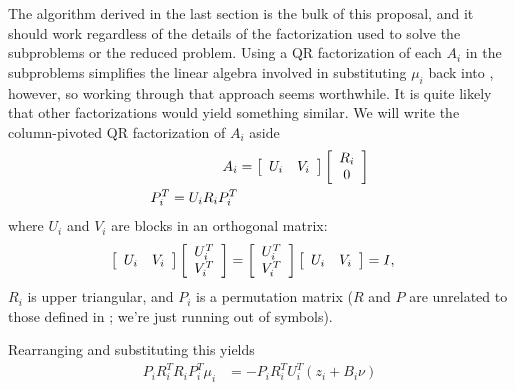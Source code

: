 The algorithm derived in the last section is the bulk of this proposal, and it should work regardless of the details of the factorization used to solve the subproblems or the reduced problem.
Using a QR factorization of each $A_i$ in the subproblems  simplifies the linear algebra involved in substituting $\mu_i$ back into , however, so working through that approach seems worthwhile.
It is quite likely that other factorizations would yield something similar.
We will write the column-pivoted QR factorization of $A_i$ aside
\begin{align}
    A_i &= \left[
        \begin{array}{ c c }
            U_i & V_i
        \end{array}
    \right]
    \left[
        \begin{array}{ c }
            R_i \\
            0
        \end{array}
    \right] \\
    P_i^T
    = U_i R_i P_i^T
\end{align}
where $U_i$ and $V_i$ are blocks in an orthogonal matrix:
\begin{align}
    \left[
        \begin{array}{ c c }
            U_i & V_i
        \end{array}
    \right]
    \left[
        \begin{array}{ c }
            U_i^T \\
            V_i^T
        \end{array}
    \right]
    &=
    \left[
        \begin{array}{ c }
            U_i^T \\
            V_i^T
        \end{array}
    \right]
    \left[
        \begin{array}{ c c }
            U_i & V_i
        \end{array}
    \right]
    = I,
\end{align}
$R_i$ is upper triangular, and $P_i$ is a permutation matrix ($R$ and $P$ are unrelated to those defined in ; we're just running out of symbols).

Rearranging  and substituting this yields
\begin{align}
    P_i R_i^T R_i P_i^T \mu_i &= -P_i R_i^T U_i^T \left(z_i + B_i\nu\right) \label{eq:vp_star_subproblem_qr_1}
\end{align}

